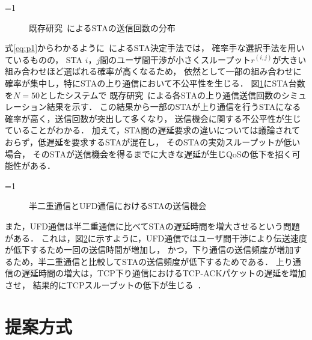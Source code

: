 \documentclass[master]{kuisthesis}		%
\newcommand{\sij}{(i,j)}
\newcommand{\rij}{r^{\sij}}
\newcounter{flagFig}
\begin{document}
			\par
			\ifnum\value{flagFig}=1 {\begin{figure}[t]
				\centering
				\caption{既存研究~\cite{promac}によるSTAの送信回数の分布}
				\label{fig:numtx}
			\end{figure}}\fi
			式\eqref{eq:p1}からわかるように~\cite{promac}によるSTA決定手法では，
			確率手な選択手法を用いているものの，
			STA $i$，$j$間のユーザ間干渉が小さくスループット$\rij$が大きい組み合わせほど選ばれる確率が高くなるため，
			依然として一部の組み合わせに確率が集中し，特にSTAの上り通信において不公平性を生じる．
			図\ref{fig:numtx}にSTA台数を$N=50$としたシステムで
			既存研究~\cite{promac}による各STAの上り通信送信回数のシミュレーション結果を示す．
			この結果から一部のSTAが上り通信を行うSTAになる確率が高く，送信回数が突出して多くなり，
			送信機会に関する不公平性が生じていることがわかる．
			加えて，STA間の遅延要求の違いについては議論されておらず，低遅延を要求するSTAが混在し，
			そのSTAの実効スループットが低い場合，
			そのSTAが送信機会を得るまでに大きな遅延が生じQoSの低下を招く可能性がある．
			\par
			\ifnum\value{flagFig}=1 {\begin{figure}[t]
				\centering
				\caption{半二重通信とUFD通信におけるSTAの送信機会}
				\label{fig:problem}
			\end{figure}}\fi
			また，UFD通信は半二重通信に比べてSTAの遅延時間を増大させるという問題がある．
			これは，図\ref{fig:problem}に示すように，UFD通信ではユーザ間干渉により伝送速度が低下するため一回の送信時間が増加し，
			かつ，下り通信の送信頻度が増加するため，半二重通信と比較してSTAの送信頻度が低下するためである．
			上り通信の遅延時間の増大は，TCP下り通信におけるTCP-ACKパケットの遅延を増加させ，
			結果的にTCPスループットの低下が生じる~\cite{rtt}．


\section{提案方式}
\end{document}
